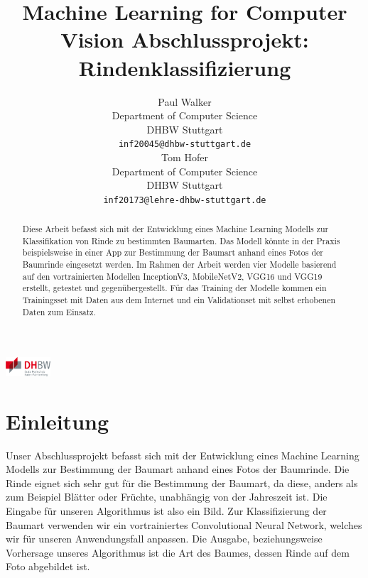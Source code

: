 \documentclass{article}
\title{Machine Learning for Computer Vision Abschlussprojekt: Rindenklassifizierung}
\author{
  Paul Walker\\
  Department of Computer Science\\
  DHBW Stuttgart\\
  \texttt{inf20045@dhbw-stuttgart.de} \\
  \And
  Tom Hofer\\
  Department of Computer Science\\
  DHBW Stuttgart\\
  \texttt{inf20173@lehre-dhbw-stuttgart.de} \\
}
\begin{document}
\begin{center}
\includegraphics[height=0.7cm]{DHBW_logo}
\end{center}

\maketitle

\begin{abstract}
  Diese Arbeit befasst sich mit der Entwicklung eines Machine Learning Modells zur Klassifikation von Rinde zu bestimmten Baumarten. Das Modell könnte in der Praxis beispielsweise in einer App zur Bestimmung der Baumart anhand eines Fotos der Baumrinde eingesetzt werden. Im Rahmen der Arbeit werden vier Modelle basierend auf den vortrainierten Modellen InceptionV3, MobileNetV2, VGG16 und VGG19 erstellt, getestet und gegenübergestellt. Für das Training der Modelle kommen ein Trainingsset mit Daten aus dem Internet und ein Validationset mit selbst erhobenen Daten zum Einsatz.
\end{abstract}

\section{Einleitung}
Unser Abschlussprojekt befasst sich mit der Entwicklung eines Machine Learning Modells zur Bestimmung der Baumart anhand eines Fotos der Baumrinde. Die Rinde eignet sich sehr gut für die Bestimmung der Baumart, da diese, anders als zum Beispiel Blätter oder Früchte, unabhängig von der Jahreszeit ist. Die Eingabe für unseren Algorithmus ist also ein Bild. Zur Klassifizierung der Baumart verwenden wir ein vortrainiertes Convolutional Neural Network, welches wir für unseren Anwendungsfall anpassen. Die Ausgabe, beziehungsweise Vorhersage unseres Algorithmus ist die Art des Baumes, dessen Rinde auf dem Foto abgebildet ist.
\end{document}
